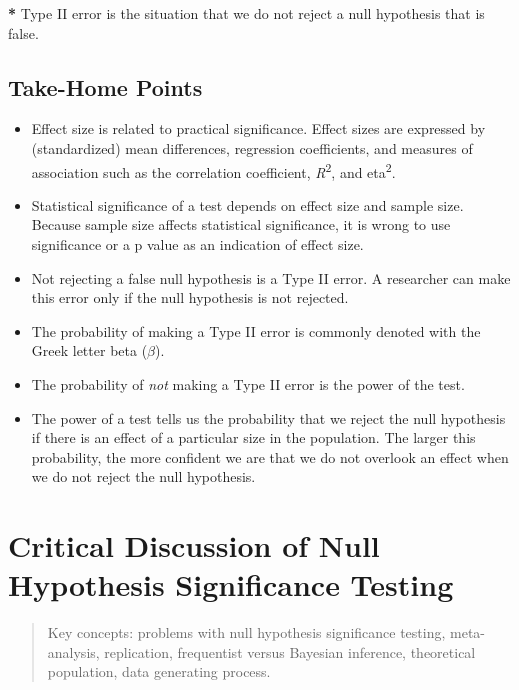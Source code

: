 \documentclass[a4paper]{book}
\newenvironment{Shaded}{\begin{snugshade}}{\end{snugshade}}
\newcommand{\StringTok}[1]{\textcolor[rgb]{0.00,0.00,0.00}{#1}}
\newcommand{\OperatorTok}[1]{\textcolor[rgb]{0.00,0.00,0.00}{\textbf{#1}}}
\newcommand{\NormalTok}[1]{#1}
\theoremstyle{definition}
\theoremstyle{definition}
\theoremstyle{definition}
\theoremstyle{remark}
\begin{document}
\begin{Shaded}
\begin{Highlighting}[]
\OperatorTok{*}\StringTok{ }\NormalTok{Type II error is the situation that we do not reject a null hypothesis that}
\NormalTok{is false.}
\end{Highlighting}
\end{Shaded}

\section{Take-Home Points}\label{take-home-points-4}

\begin{itemize}
\item
  Effect size is related to practical significance. Effect sizes are
  expressed by (standardized) mean differences, regression coefficients,
  and measures of association such as the correlation coefficient,
  \emph{R}\textsuperscript{2}, and eta\textsuperscript{2}.
\item
  Statistical significance of a test depends on effect size and sample
  size. Because sample size affects statistical significance, it is
  wrong to use significance or a p value as an indication of effect
  size.
\item
  Not rejecting a false null hypothesis is a Type II error. A researcher
  can make this error only if the null hypothesis is not rejected.
\item
  The probability of making a Type II error is commonly denoted with the
  Greek letter beta (\(\beta\)).
\item
  The probability of \emph{not} making a Type II error is the power of
  the test.
\item
  The power of a test tells us the probability that we reject the null
  hypothesis if there is an effect of a particular size in the
  population. The larger this probability, the more confident we are
  that we do not overlook an effect when we do not reject the null
  hypothesis.
\end{itemize}

\chapter{Critical Discussion of Null Hypothesis Significance
Testing}\label{crit-discus}

\begin{quote}
Key concepts: problems with null hypothesis significance testing,
meta-analysis, replication, frequentist versus Bayesian inference,
theoretical population, data generating process.
\end{quote}
\end{document}
